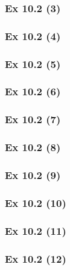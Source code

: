 \subsubsection{Ex 10.2 (3)}\label{sec:Ex_10.2.3}

\subsubsection{Ex 10.2 (4)}\label{sec:Ex_10.2.4}

\subsubsection{Ex 10.2 (5)}\label{sec:Ex_10.2.5}

\subsubsection{Ex 10.2 (6)}\label{sec:Ex_10.2.6}

\subsubsection{Ex 10.2 (7)}\label{sec:Ex_10.2.7}

\subsubsection{Ex 10.2 (8)}\label{sec:Ex_10.2.8}

\subsubsection{Ex 10.2 (9)}\label{sec:Ex_10.2.9}

\subsubsection{Ex 10.2 (10)}\label{sec:Ex_10.2.10}

\newpage		%

\subsubsection{Ex 10.2 (11)}\label{sec:Ex_10.2.11}

\subsubsection{Ex 10.2 (12)}\label{sec:Ex_10.2.12}

